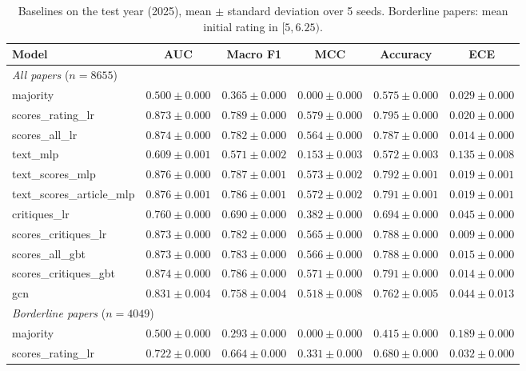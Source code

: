 \begin{table}[t]
\centering
\caption{Baselines on the test year (2025), mean $\pm$ standard deviation over 5 seeds. Borderline papers: mean initial rating in $[5, 6.25)$.}
\label{tab:baselines}
\begin{tabular}{lccccc}
\toprule
Model & AUC & Macro F1 & MCC & Accuracy & ECE \\
\midrule
\multicolumn{6}{l}{\emph{All papers} ($n = 8655$)} \\
majority & $0.500 \pm 0.000$ & $0.365 \pm 0.000$ & $0.000 \pm 0.000$ & $0.575 \pm 0.000$ & $0.029 \pm 0.000$ \\
scores\_rating\_lr & $0.873 \pm 0.000$ & $0.789 \pm 0.000$ & $0.579 \pm 0.000$ & $0.795 \pm 0.000$ & $0.020 \pm 0.000$ \\
scores\_all\_lr & $0.874 \pm 0.000$ & $0.782 \pm 0.000$ & $0.564 \pm 0.000$ & $0.787 \pm 0.000$ & $0.014 \pm 0.000$ \\
text\_mlp & $0.609 \pm 0.001$ & $0.571 \pm 0.002$ & $0.153 \pm 0.003$ & $0.572 \pm 0.003$ & $0.135 \pm 0.008$ \\
text\_scores\_mlp & $0.876 \pm 0.000$ & $0.787 \pm 0.001$ & $0.573 \pm 0.002$ & $0.792 \pm 0.001$ & $0.019 \pm 0.001$ \\
text\_scores\_article\_mlp & $0.876 \pm 0.001$ & $0.786 \pm 0.001$ & $0.572 \pm 0.002$ & $0.791 \pm 0.001$ & $0.019 \pm 0.001$ \\
critiques\_lr & $0.760 \pm 0.000$ & $0.690 \pm 0.000$ & $0.382 \pm 0.000$ & $0.694 \pm 0.000$ & $0.045 \pm 0.000$ \\
scores\_critiques\_lr & $0.873 \pm 0.000$ & $0.782 \pm 0.000$ & $0.565 \pm 0.000$ & $0.788 \pm 0.000$ & $0.009 \pm 0.000$ \\
scores\_all\_gbt & $0.873 \pm 0.000$ & $0.783 \pm 0.000$ & $0.566 \pm 0.000$ & $0.788 \pm 0.000$ & $0.015 \pm 0.000$ \\
scores\_critiques\_gbt & $0.874 \pm 0.000$ & $0.786 \pm 0.000$ & $0.571 \pm 0.000$ & $0.791 \pm 0.000$ & $0.014 \pm 0.000$ \\
gcn & $0.831 \pm 0.004$ & $0.758 \pm 0.004$ & $0.518 \pm 0.008$ & $0.762 \pm 0.005$ & $0.044 \pm 0.013$ \\
\midrule
\multicolumn{6}{l}{\emph{Borderline papers} ($n = 4049$)} \\
majority & $0.500 \pm 0.000$ & $0.293 \pm 0.000$ & $0.000 \pm 0.000$ & $0.415 \pm 0.000$ & $0.189 \pm 0.000$ \\
scores\_rating\_lr & $0.722 \pm 0.000$ & $0.664 \pm 0.000$ & $0.331 \pm 0.000$ & $0.680 \pm 0.000$ & $0.032 \pm 0.000$ \\

\end{tabular}
\end{table}
